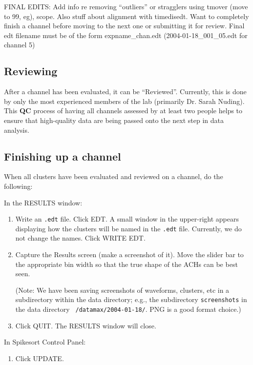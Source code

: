 \documentclass[12pt]{article}
\begin{document}
{\color{black}
FINAL EDITS: Add info re removing ``outliers'' or stragglers using tmover (move to 99, eg), scope. Also stuff about
alignment with timedisedt. Want to completely finish a channel before moving to the next one or submitting it for
review. Final edt filename must be of the form expname\_chan.edt (2004-01-18\_001\_05.edt for channel 5)}
\fi

\bigskip

\subsection{Reviewing}

After a channel has been evaluated, it can be ``Reviewed''. Currently,
this is done by only the most experienced members of the lab
(primarily Dr. Sarah Nuding). This \textbf{QC} process of having all
channels assessed by at least two people helps to ensure that
high-quality data are being passed onto the next step in data
analysis.

\newpage
\subsection{Finishing up a channel}

When all clusters have been evaluated and reviewed on a channel, do
the following:

In the {\sf RESULTS} window:
\begin{enumerate}
\item Write an {\tt *.edt} file. Click {\sf EDT}. A small window in
  the upper-right appears displaying how the clusters will be named in
  the {\tt *.edt} file. Currently, we do not change the names. Click
  {\sf WRITE EDT}.
\item Capture the Results screen (make a screenshot of it). Move the
  slider bar to the appropriate bin width so that the true shape of
  the ACHs can be best seen.

  (Note: We have been saving screenshots of waveforms, clusters, etc
  in a subdirectory within the data directory; e.g., the subdirectory
  {\tt screenshots} in the data directory {\tt
    /datamax/2004-01-18/}. PNG is a good format choice.)
\item Click {\sf QUIT}. The {\sf RESULTS} window will close.
\end{enumerate}
In {\sf Spikesort Control Panel}:
\begin{enumerate}[resume]
\item Click {\sf UPDATE}.
\end{enumerate}
\end{document}
